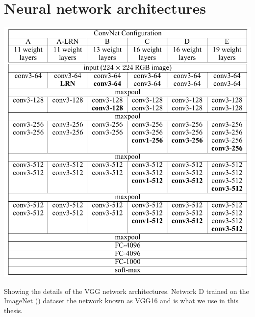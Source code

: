 \chapter{Neural network architectures}

\begin{table}
\includegraphics[width=\textwidth]{vgg_architectures.png}
\caption[vgg architectures]{Showing the details of the VGG network architectures. Network D trained on the ImageNet (\cite{Russakovsky2015}) dataset the network known as  VGG16 and is what we use in this thesis.}\label{tab:vgg}
\end{table}
